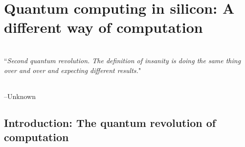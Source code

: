 
\chapter{Quantum computing in silicon: A different way of computation} %

\label{Chapter1} %

\HRule
\vspace{0.5cm} \hspace{2cm}
\small
\hangindent=4cm
\\
        ``\emph{Second quantum revolution. The definition of insanity is doing the same thing over and over and expecting different results.}" 
\\ \\
\hangindent=4cm
\begin{flushright}
--Unknown \\
\end{flushright}

\vspace{0.5cm}

\noindent \HRule
\clearpage




\newcommand{\keyword}[1]{\textbf{#1}}
\newcommand{\tabhead}[1]{\textbf{#1}}
\newcommand{\code}[1]{\texttt{#1}}
\newcommand{\file}[1]{\texttt{\bfseries#1}}
\newcommand{\option}[1]{\texttt{\itshape#1}}



\section{Introduction: The quantum revolution of computation}

